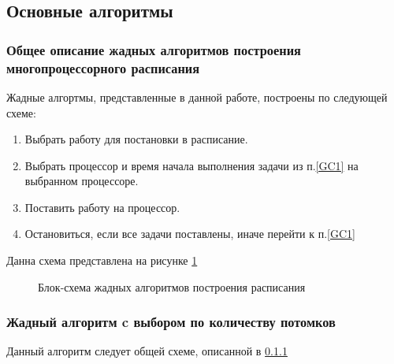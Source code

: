 \subsection{Основные алгоритмы}
\subsubsection{Общее описание жадных алгоритмов построения многопроцессорного расписания} \label{algo_template}
Жадные алгортмы, представленные в данной работе, построены по следующей схеме:
\begin{enumerate}
    \item \label{GC1} Выбрать работу для постановки в расписание.
    \item \label{GC2} Выбрать процессор и время начала выполнения задачи из п.\ref{GC1} на выбранном процессоре.
    \item Поставить работу на процессор.
    \item Остановиться, если все задачи поставлены, иначе перейти к п.\ref{GC1}
\end{enumerate}

Данна схема представлена на рисунке \ref{fig:block-schema}

\begin{figure}[!htbp]
    \caption{Блок-схема жадных алгоритмов построения расписания}
    \label{fig:block-schema}
\end{figure}

\subsubsection{Жадный алгоритм c выбором по количеству потомков} \label{Greedy_GC1}
Данный алгоритм следует общей схеме, описанной в \ref{algo_template}

